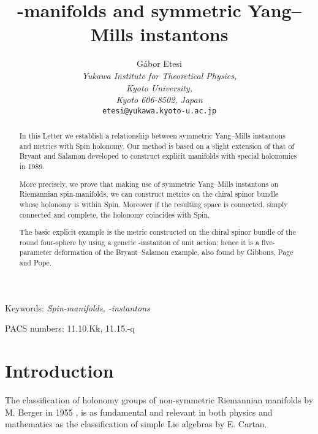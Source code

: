 \documentclass[a4paper,12pt,draft]{article}
\begin{document}
\title{\coordHE{}-manifolds and symmetric Yang--Mills instantons}

\author{G\'abor Etesi
\\ {\it Yukawa Institute for Theoretical Physics,}
\\ {\it  Kyoto University,}
\\{\it Kyoto 606-8502, Japan}
\\ {\tt etesi@yukawa.kyoto-u.ac.jp}}

\maketitle

\pagestyle{myheadings}

\thispagestyle{empty}

\begin{abstract}
In this Letter we establish a relationship between symmetric
\coordHE{} Yang--Mills instantons and metrics with Spin\coordHE{} holonomy. 
Our method is based on a slight extension of that of Bryant and
Salamon developed to construct explicit manifolds with special holonomies
in 1989.

More precisely, we prove that making use of symmetric \coordHE{} Yang--Mills
instantons on Riemannian spin-manifolds, we can construct metrics on the
chiral spinor bundle whose holonomy is within Spin\coordHE{}. Moreover if the
resulting space is connected, simply connected and complete, the
holonomy coincides with Spin\coordHE{}. 

The basic explicit example is the metric constructed on the chiral spinor 
bundle of the round four-sphere by using a generic \coordHE{}-instanton
of unit action; hence it is a five-parameter deformation of the
Bryant--Salamon example, also found by Gibbons, Page and Pope. 

\end{abstract}
\centerline{Keywords: {\it {\rm Spin}\coordHE{}-manifolds, \coordHE{}-instantons}}
\centerline{PACS numbers: 11.10.Kk, 11.15.-q}

\section{Introduction}
The classification of holonomy groups of non-symmetric
Riemannian manifolds by M. Berger in 1955 \cite{ber}, is as fundamental
and relevant in both physics and mathematics as the classification of
simple Lie algebras by E. Cartan. 
\end{document}
